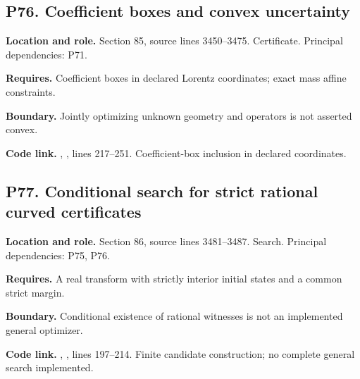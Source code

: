 \documentclass[11pt,oneside,openany]{book}
\numberwithin{equation}{section}
\begin{document}
\par\noindent\begin{minipage}{\textwidth}
\subsection{P76. Coefficient boxes and convex
uncertainty}\label{LSMRegister:p76.-coefficient-boxes-and-convex-uncertainty}

\textbf{Location and role.} Section 85, source lines 3450--3475.
Certificate. Principal dependencies: P71.

\textbf{Requires.} Coefficient boxes in declared Lorentz coordinates;
exact mass affine constraints.

\textbf{Boundary.} Jointly optimizing unknown geometry and operators is
not asserted convex.

\textbf{Code link.} ,
, lines 217--251. Coefficient-box inclusion
in declared coordinates.
\end{minipage}\par\medskip

\par\noindent\begin{minipage}{\textwidth}
\subsection{P77. Conditional search for strict rational curved
certificates}\label{LSMRegister:p77.-conditional-search-for-strict-rational-curved-certificates}

\textbf{Location and role.} Section 86, source lines 3481--3487. Search.
Principal dependencies: P75, P76.

\textbf{Requires.} A real transform with strictly interior initial
states and a common strict margin.

\textbf{Boundary.} Conditional existence of rational witnesses is not an
implemented general optimizer.

\textbf{Code link.} ,
, lines 197--214. Finite candidate
construction; no complete general search implemented.
\end{minipage}\par\medskip
\end{document}
